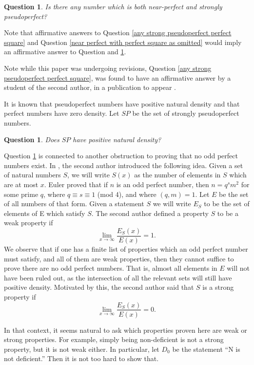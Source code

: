 \documentclass{article}
\newtheorem{question}[theorem]{Question}
\begin{document}
\begin{question} Is there any number which is both near-perfect and strongly pseudoperfect? \label{any near perfect and strongly pseudoperfect}
\end{question}

Note that affirmative answers to Question \ref{any strong pseudoperfect perfect square} and Question \ref{near perfect with perfect square as omitted} would imply an affirmative answer to Question  and \ref{any near perfect and strongly pseudoperfect}. 

Note while this paper was undergoing revisions, Question \ref{any strong pseudoperfect perfect square}, was found to have an affirmative answer by a student of the second author, in a publication to appear \cite{WZ}. 

It is known that pseudoperfect numbers have positive natural density  and that perfect numbers have zero density.\cite{Benkoski and Erdos}\cite{Hornfeck and Wirsing} Let $SP$ be the set of strongly pseudoperfect numbers.  

\begin{question} Does $SP$ have positive natural density? \label{strongly pseudoperfect natural density}
\end{question}

Question \ref{strongly pseudoperfect natural density} is connected to another obstruction to proving that no odd perfect numbers exist. In \cite{Zelinskybig}, the second author introduced the following idea. Given a set of natural numbers $S$, we will write $S(x)$ as the number of elements in $S$ which are at most $x$.  Euler proved that if $n$ is an odd  perfect number, then $n=q^sm^2$ for some prime $q$, where $q \equiv s \equiv 1$ (mod 4), and where $(q,m)=1$. Let $E$ be the set of all numbers of that form. Given a statement $S$ we will write $E_S$ to be the set of elements of E which satisfy $S$. The second author defined a property $S$ to be a weak property if
$$\lim_{x \rightarrow \infty} \frac{E_S(x)}{E(x)} = 1.$$ We observe that if one has a finite list of properties which an odd perfect number must satisfy, and all of them are weak properties, then they cannot suffice to prove there are no odd perfect numbers. That is, almost all elements in $E$ will not have been ruled out, as the intersection of all the relevant sets will still have positive density. Motivated by this, the second author said that $S$ is a strong property if $$\lim_{x \rightarrow \infty} \frac{E_S(x)}{E(x)} = 0.$$

In that context, it seems natural to ask which properties proven here are weak or strong properties. For example, simply being non-deficient is not a strong property, but it is not weak either. In particular, let $D_0$ be the statement ``N is not deficient.'' Then it is not too hard to show that.
\end{document}
